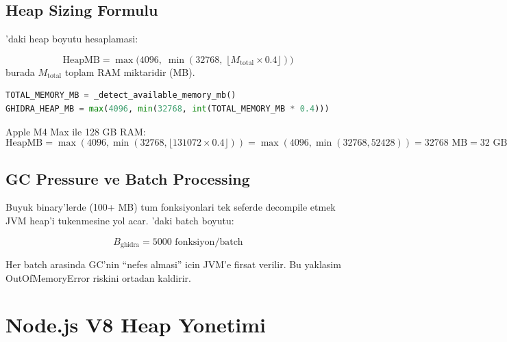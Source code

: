 \subsection{Heap Sizing Formulu}

'daki heap boyutu hesaplamasi:

\begin{equation}
  \text{HeapMB} = \max\bigl(4096,\; \min(32768,\; \lfloor M_{\text{total}} \times 0.4 \rfloor)\bigr)
  \label{eq:heap-size}
\end{equation}
burada $M_{\text{total}}$ toplam RAM miktaridir (MB).

\begin{lstlisting}[language=Python, caption={Ghidra heap sizing (config.py)}]
TOTAL_MEMORY_MB = _detect_available_memory_mb()
GHIDRA_HEAP_MB = max(4096, min(32768, int(TOTAL_MEMORY_MB * 0.4)))
\end{lstlisting}

\begin{example}
Apple M4 Max ile 128 GB RAM:
\begin{equation}
  \text{HeapMB} = \max(4096, \min(32768, \lfloor 131072 \times 0.4 \rfloor))
                = \max(4096, \min(32768, 52428))
                = 32768 \text{ MB} = 32 \text{ GB}
\end{equation}
\end{example}

\subsection{GC Pressure ve Batch Processing}

Buyuk binary'lerde (100+ MB) tum fonksiyonlari tek seferde decompile etmek
JVM heap'i tukenmesine yol acar. 'daki batch boyutu:

\begin{equation}
  B_{\text{ghidra}} = 5000 \text{ fonksiyon/batch}
  \label{eq:ghidra-batch}
\end{equation}

Her batch arasinda GC'nin ``nefes almasi'' icin JVM'e firsat verilir.
Bu yaklasim OutOfMemoryError riskini ortadan kaldirir.


\section{Node.js V8 Heap Yonetimi}
\label{sec:v8-heap}

